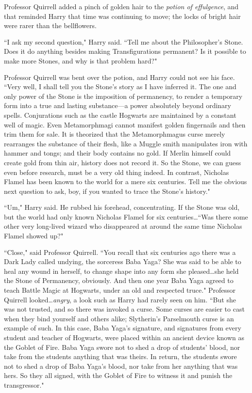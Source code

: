 Professor Quirrell added a pinch of golden hair to the \emph{potion of effulgence}, and that reminded Harry that time was continuing to move; the locks of bright hair were rarer than the bellflowers.

``I ask my second question," Harry said. ``Tell me about the Philosopher's Stone. Does it do anything besides making Transfigurations permanent? Is it possible to make more Stones, and why is that problem hard?"

Professor Quirrell was bent over the potion, and Harry could not see his face. ``Very well, I shall tell you the Stone's story as I have inferred it. The one and only power of the Stone is the imposition of permanency, to render a temporary form into a true and lasting substance—a power absolutely beyond ordinary spells. Conjurations such as the castle Hogwarts are maintained by a constant well of magic. Even Metamorphmagi cannot manifest golden fingernails and then trim them for sale. It is theorized that the Metamorphmagus curse merely rearranges the substance of their flesh, like a Muggle smith manipulates iron with hammer and tongs; and their body contains no gold. If Merlin himself could create gold from thin air, history does not record it. So the Stone, we can guess even before research, must be a very old thing indeed. In contrast, Nicholas Flamel has been known to the world for a mere six centuries. Tell me the obvious next question to ask, boy, if you wanted to trace the Stone's history."

``Um," Harry said. He rubbed his forehead, concentrating. If the Stone was old, but the world had only known Nicholas Flamel for six centuries…``Was there some other very long-lived wizard who disappeared at around the same time Nicholas Flamel showed up?"

``Close," said Professor Quirrell. ``You recall that six centuries ago there was a Dark Lady called undying, the sorceress Baba Yaga? She was said to be able to heal any wound in herself, to change shape into any form she pleased…she held the Stone of Permanency, obviously. And then one year Baba Yaga agreed to teach Battle Magic at Hogwarts, under an old and respected truce." Professor Quirrell looked…\emph{angry}, a look such as Harry had rarely seen on him. ``But she was not trusted, and so there was invoked a curse. Some curses are easier to cast when they bind yourself and others alike; Slytherin's Parselmouth curse is an example of such. In this case, Baba Yaga's signature, and signatures from every student and teacher of Hogwarts, were placed within an ancient device known as the Goblet of Fire. Baba Yaga swore not to shed a drop of students' blood, nor take from the students anything that was theirs. In return, the students swore not to shed a drop of Baba Yaga's blood, nor take from her anything that was hers. So they all signed, with the Goblet of Fire to witness it and punish the transgressor."


